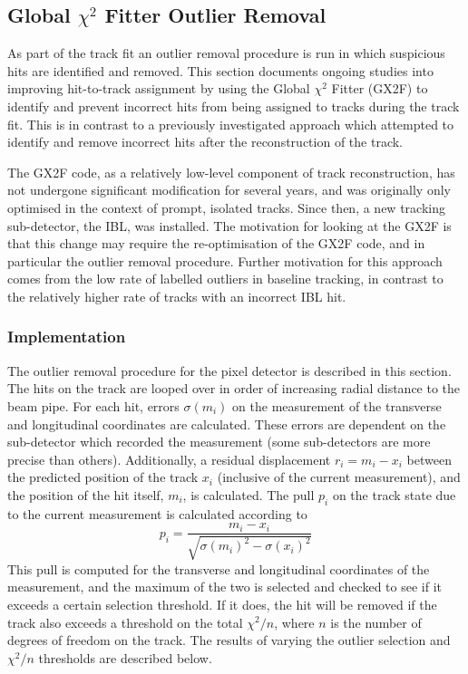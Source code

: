 \subsection{Global \texorpdfstring{$\chi^2$}{chi2} Fitter Outlier Removal}\label{sec:gx2f_opt}

As part of the track fit an outlier removal procedure is run in which suspicious hits are identified and removed.
This section documents ongoing studies into improving hit-to-track assignment by using the Global $\chi^2$ Fitter (GX2F) to identify and prevent incorrect hits from being assigned to tracks during the track fit.
This is in contrast to a previously investigated approach \cite{AdorniBraccesiChiassi:2021irw} which attempted to identify and remove incorrect hits after the reconstruction of the track.

The GX2F code, as a relatively low-level component of track reconstruction, has not undergone significant modification for several years, and was originally only optimised in the context of prompt, isolated tracks.
Since then, a new tracking sub-detector, the IBL, was installed.
The motivation for looking at the GX2F is that this change may require the re-optimisation of the GX2F code, and in particular the outlier removal procedure.
Further motivation for this approach comes from the low rate of labelled outliers in baseline tracking, in contrast to the relatively higher rate of tracks with an incorrect IBL hit.


\subsubsection{Implementation}
The outlier removal procedure for the pixel detector is described in this section. The hits on the track are looped over in order of increasing radial distance to the beam pipe. For each hit, errors $\sigma(m_i)$ on the measurement of the transverse and longitudinal coordinates are calculated. These errors are dependent on the sub-detector which recorded the measurement (some sub-detectors are more precise than others). Additionally, a residual displacement $r_i = m_i - x_i$ between the predicted position of the track $x_i$ (inclusive of the current measurement), and the position of the hit itself, $m_i$, is calculated. The pull $p_i$ on the track state due to the current measurement is calculated according to
%
\begin{equation}
    p_i = \frac{m_i - x_i}{\sqrt{\sigma(m_i)^2 - \sigma(x_i)^2}}
\end{equation}
%
This pull is computed for the transverse and longitudinal coordinates of the measurement, and the maximum of the two is selected and checked to see if it exceeds a certain selection threshold. If it does, the hit will be removed if the track also exceeds a threshold on the total $\chi^2/n$, where $n$ is the number of degrees of freedom on the track.
The results of varying the outlier selection and $\chi^2/n$ thresholds are described below.


